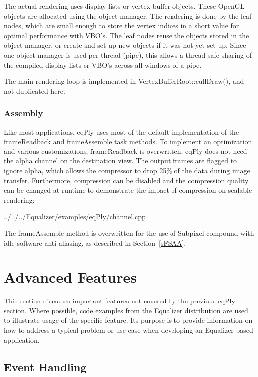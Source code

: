 \documentclass[10pt,a4]{scrartcl}
\newcommand{\sref}[1]{Section~\ref{#1}}
\begin{document}
The actual rendering uses display lists or vertex buffer objects. These
OpenGL objects are allocated using the object manager. The rendering is
done by the leaf nodes, which are small enough to store the vertex
indices in a \textsf{short} value for optimal performance with VBO's.
The leaf nodes reuse the objects stored in the object manager, or create
and set up new objects if it was not yet set up. Since one object
manager is used per thread (pipe), this allows a thread-safe sharing of
the compiled display lists or VBO's across all windows of a pipe.

The main rendering loop is implemented in \textsf{VertexBufferRoot::cullDraw()},
and not duplicated here.

\subsubsection{Assembly}

Like most applications, eqPly uses most of the default implementation of the
\textsf{frameReadback} and \textsf{frameAssemble} task methods. To implement an
optimization and various customizations, \textsf{frame\-Read\-back} is
overwritten. eqPly does not need the alpha channel on the destination view. The
output frames are flagged to ignore alpha, which allows the compressor to drop
25\% of the data during image transfer. Furthermore, compression can be
disabled and the compression quality can be changed at runtime to demonstrate
the impact of compression on scalable rendering:

{\footnotesize
  {../../../Equalizer/examples/eqPly/channel.cpp}}

The \textsf{frameAssemble} method is overwritten for the use of Subpixel
compound with idle software anti-aliasing, as described in \sref{sFSAA}.



\section{Advanced Features}

This section discusses important features not covered by the previous
\textsf{eqPly} section. Where possible, code examples from the Equalizer
distribution are used to illustrate usage of the specific feature. Its
purpose is to provide information on how to address a typical problem or
use case when developing an Equalizer-based application.


\subsection{\label{sEventHandling}Event Handling}
\end{document}

